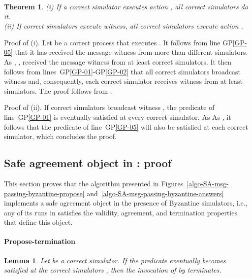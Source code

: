 \documentclass[11pt,letterpaper]{article}
\newtheorem{theorem}{Theorem}
\newtheorem{lemma}{Lemma}
\newlength {\afterproof}
\newcommand{\toto}{xxx}
\newenvironment{proofT}{\noindent{\bf Proof }}
{\hspace*{\fill}\par\vspace{\afterproof}}
\begin{document}
\begin{theorem}
\label{theo-generic-pattern}
{\em (i)} If a correct simulator  executes  action ,
all correct simulators do it.\\
{\em(ii)}  If  correct simulators execute 
{\sc witness},  all correct simulators execute action .
\end{theorem}

\begin{proofT}
Proof of (i). Let  be a correct process that executes .
It follows from line GP\ref{GP-05} that it has received the message
{\sc witness}  from more than  different simulators.
As , ,
 received the message {\sc witness}  from at least 
correct simulators. It then follows from lines~GP\ref{GP-01}-GP\ref{GP-02}
that all correct simulators broadcast {\sc witness}  and, consequently,
each correct simulator receives {\sc witness}  from at least 
simulators. The proof follows from .


Proof of (ii). If  correct simulators broadcast {\sc witness} ,
the predicate of line~GP\ref{GP-01} is eventually  satisfied
at every correct simulator.  As  As ,
it follows that the predicate of line~GP\ref{GP-05}  will also be
satisfied at each correct simulator, which concludes the proof.
\renewcommand{\toto}{theo-generic-pattern}
\end{proofT}
\subsection{Safe agreement object in : proof}
This section proves that the algorithm presented in
Figures~\ref{algo-SA-msg-passing-byzantine-propose}
and~\ref{algo-SA-msg-passing-byzantine-answers} implements a
safe agreement object in the presence of Byzantine simulators,
i.e., any of its runs in    satisfies the validity, agreement,
and termination properties that define this object.



\paragraph{Propose-termination}

\begin{lemma}
\label{lemma-termination-if-valid}
Let  be a correct simulator.
If the predicate  eventually becomes satisfied
at the correct simulators ,
then the invocation of  by  terminates.
\end{lemma}
\end{document}
